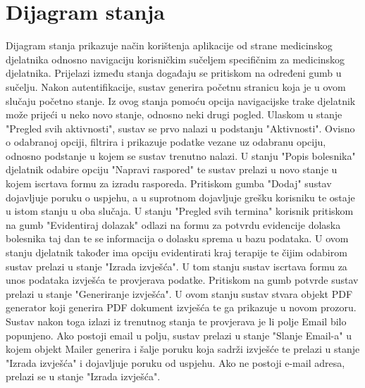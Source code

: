 			
			
			
			
			
			\eject
		
		\section{Dijagram stanja}
			
			
			
			
			Dijagram stanja prikazuje način korištenja aplikacije od strane medicinskog djelatnika odnosno navigaciju korisničkim sučeljem specifičnim za medicinskog djelatnika. Prijelazi između stanja događaju se pritiskom na određeni gumb u sučelju. Nakon autentifikacije, sustav generira početnu stranicu koja je u ovom slučaju početno stanje. Iz ovog stanja pomoću opcija navigacijske trake djelatnik može prijeći u neko novo stanje, odnosno neki drugi pogled. Ulaskom u stanje "Pregled svih aktivnosti", sustav se prvo nalazi u podstanju "Aktivnosti". Ovisno o odabranoj opciji, filtrira i prikazuje podatke vezane uz odabranu opciju, odnosno podstanje u kojem se sustav trenutno nalazi.
			U stanju "Popis bolesnika" djelatnik odabire opciju "Napravi raspored" te sustav prelazi u novo stanje u kojem iscrtava formu za izradu rasporeda. Pritiskom gumba "Dodaj" sustav dojavljuje poruku o uspjehu, a u suprotnom dojavljuje grešku korisniku te ostaje u istom stanju u oba slučaja. U stanju "Pregled svih termina" korisnik pritiskom na gumb "Evidentiraj dolazak" odlazi na formu za potvrdu evidencije dolaska bolesnika taj dan te se informacija o dolasku sprema u bazu podataka. U ovom stanju djelatnik također ima opciju evidentirati kraj terapije te čijim odabirom sustav prelazi u stanje "Izrada izvješća". U tom stanju sustav iscrtava formu za unos podataka izvješća te provjerava podatke. Pritiskom na gumb potvrde sustav prelazi u stanje "Generiranje izvješća". U ovom stanju sustav stvara objekt PDF generator koji generira PDF dokument izvješća te ga prikazuje u novom prozoru. Sustav nakon toga izlazi iz trenutnog stanja te provjerava je li polje Email bilo popunjeno. Ako postoji email u polju, sustav prelazi u stanje "Slanje Email-a" u kojem objekt Mailer generira i šalje poruku koja sadrži izvješće te prelazi u stanje "Izrada izvješća" i dojavljuje poruku od uspjehu. Ako ne postoji e-mail adresa, prelazi se u stanje "Izrada izvješća".
			

